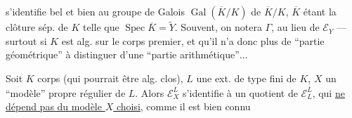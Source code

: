 
s'identifie bel et bien au groupe de Galois $\operatorname{Gal}(\overline K/K)$ de  $\overline K/K$, $\overline K$ étant la clôture sép. de $K$ telle que $\operatorname{Spec}\overline K=\widetilde Y$. Souvent, on notera $\Gamma$,  au lieu de $\mathcal E_Y$ --- surtout si $K$ est alg. sur le corps premier, et qu'il n'a donc plus de ``partie géométrique'' à distinguer d'une ``partie arithmétique''$\ldots$

Soit  $K$  corps (qui pourrait être alg. clos), $L$ une ext. de type fini de $K$, $X$ un ``modèle'' propre régulier de $L$. Alors $\mathcal E_X^{\overline L}$ s'identifie à un quotient de $\mathcal E_L^{\overline L}$, qui \uline{ne  dépend pas du modèle $X$ choisi}, comme il est bien connu

